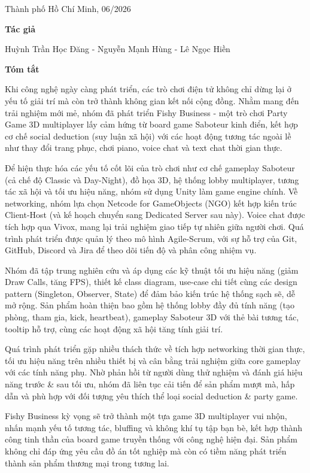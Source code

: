 \vspace{2cm}

\begin{flushright}
Thành phố Hồ Chí Minh, 06/2026

\medskip

\textbf{Tác giả}

\medskip

Huỳnh Trần Học Đăng - Nguyễn Mạnh Hùng - Lê Ngọc Hiền
\end{flushright}

\newpage

\thispagestyle{empty}
{\Huge \bfseries {Tóm tắt}}
\vspace{1cm}

Khi công nghệ ngày càng phát triển, các trò chơi điện tử không chỉ dừng lại ở yếu tố giải trí mà còn trở thành không gian kết nối cộng đồng. Nhằm mang đến trải nghiệm mới mẻ, nhóm đã phát triển Fishy Business - một trò chơi Party Game 3D multiplayer lấy cảm hứng từ board game Saboteur kinh điển, kết hợp cơ chế social deduction (suy luận xã hội) với các hoạt động tương tác ngoài lề như thay đổi trang phục, chơi piano, voice chat và text chat thời gian thực.
\bigskip

Để hiện thực hóa các yếu tố cốt lõi của trò chơi như cơ chế gameplay Saboteur (cả chế độ Classic và Day-Night), đồ họa 3D, hệ thống lobby multiplayer, tương tác xã hội và tối ưu hiệu năng, nhóm sử dụng Unity làm game engine chính. Về networking, nhóm lựa chọn Netcode for GameObjects (NGO) kết hợp kiến trúc Client-Host (và kế hoạch chuyển sang Dedicated Server sau này). Voice chat được tích hợp qua Vivox, mang lại trải nghiệm giao tiếp tự nhiên giữa người chơi. Quá trình phát triển được quản lý theo mô hình Agile-Scrum, với sự hỗ trợ của Git, GitHub, Discord và Jira để theo dõi tiến độ và phân công nhiệm vụ.
\bigskip

Nhóm đã tập trung nghiên cứu và áp dụng các kỹ thuật tối ưu hiệu năng (giảm Draw Calls, tăng FPS), thiết kế class diagram, use-case chi tiết cùng các design pattern (Singleton, Observer, State) để đảm bảo kiến trúc hệ thống sạch sẽ, dễ mở rộng. Sản phẩm hoàn thiện bao gồm hệ thống lobby đầy đủ tính năng (tạo phòng, tham gia, kick, heartbeat), gameplay Saboteur 3D với thẻ bài tương tác, tooltip hỗ trợ, cùng các hoạt động xã hội tăng tính giải trí.
\bigskip

Quá trình phát triển gặp nhiều thách thức về tích hợp networking thời gian thực, tối ưu hiệu năng trên nhiều thiết bị và cân bằng trải nghiệm giữa core gameplay với các tính năng phụ. Nhờ phản hồi từ người dùng thử nghiệm và đánh giá hiệu năng trước \& sau tối ưu, nhóm đã liên tục cải tiến để sản phẩm mượt mà, hấp dẫn và phù hợp với đối tượng yêu thích thể loại social deduction \& party game.
\bigskip

Fishy Business kỳ vọng sẽ trở thành một tựa game 3D multiplayer vui nhộn, nhấn mạnh yếu tố tương tác, bluffing và không khí tụ tập bạn bè, kết hợp thành công tinh thần của board game truyền thống với công nghệ hiện đại. Sản phẩm không chỉ đáp ứng yêu cầu đồ án tốt nghiệp mà còn có tiềm năng phát triển thành sản phẩm thương mại trong tương lai.
